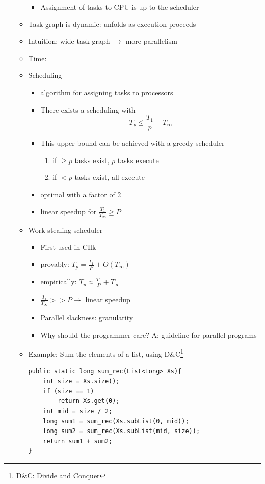 \documentclass[a4paper]{article}
\begin{document}
\begin{itemize}
\begin{itemize}
\begin{itemize}
\item Assignment of tasks to CPU is up to the scheduler
\end{itemize}
\item Task graph is dynamic: unfolds as execution proceeds
\item Intuition: wide task graph $\to$ more parallelism
\item Time:
\item Scheduling
\begin{itemize}
\item algorithm for assigning tasks to processors
\item There exists a scheduling with
\[T_p\leq \frac{T_1}{p}+T_\infty\] 
\item This upper bound can be achieved with a greedy scheduler
\begin{enumerate}
\item if $\geq p$ tasks exist, $p$ tasks execute
\item if $< p$ tasks exist, all execute
\end{enumerate}
\item optimal with a factor of 2
\item linear speedup for $\frac{T_1}{T_\infty}\geq P$
\end{itemize}
\item Work stealing scheduler
\begin{itemize}
\item First used in CIlk
\item provably: $T_p=\frac{T_1}{P}+O\left( T_\infty\right)$
\item empirically: $T_p\approx\frac{T_1}{P}+T_\infty$
\item $\frac{T_1}{T_\infty}>>P\to$ linear speedup
\item Parallel slackness: granularity
\item Why should the programmer care? A: guideline for parallel programs
\end{itemize}
\item Example: Sum the elements of a list, using D\&C\footnote{D\&C: Divide and Conquer}
\begin{lstlisting}
public static long sum_rec(List<Long> Xs){
    int size = Xs.size();
    if (size == 1)
        return Xs.get(0);
    int mid = size / 2;
    long sum1 = sum_rec(Xs.subList(0, mid)); 
    long sum2 = sum_rec(Xs.subList(mid, size)); 
    return sum1 + sum2;
}
\end{lstlisting}

\end{itemize}
\end{itemize}
\end{document}

